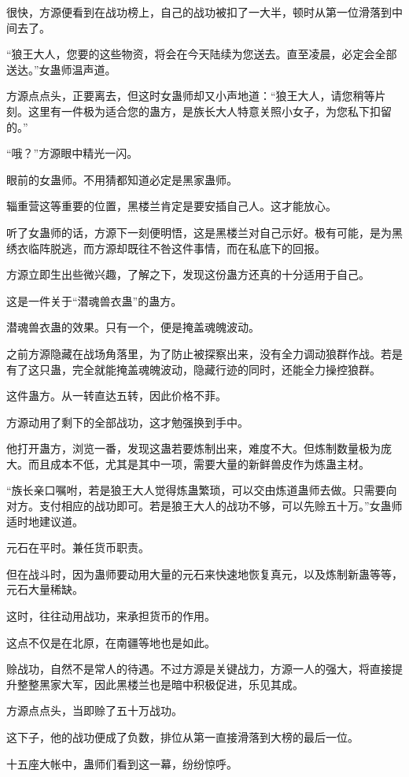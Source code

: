 \begin{this_body}
很快，方源便看到在战功榜上，自己的战功被扣了一大半，顿时从第一位滑落到中间去了。

“狼王大人，您要的这些物资，将会在今天陆续为您送去。直至凌晨，必定会全部送达。”女蛊师温声道。

方源点点头，正要离去，但这时女蛊师却又小声地道：“狼王大人，请您稍等片刻。这里有一件极为适合您的蛊方，是族长大人特意关照小女子，为您私下扣留的。”

“哦？”方源眼中精光一闪。

眼前的女蛊师。不用猜都知道必定是黑家蛊师。

辎重营这等重要的位置，黑楼兰肯定是要安插自己人。这才能放心。

听了女蛊师的话，方源下一刻便明悟，这是黑楼兰对自己示好。极有可能，是为黑绣衣临阵脱逃，而方源却既往不咎这件事情，而在私底下的回报。

方源立即生出些微兴趣，了解之下，发现这份蛊方还真的十分适用于自己。

这是一件关于“潜魂兽衣蛊”的蛊方。

潜魂兽衣蛊的效果。只有一个，便是掩盖魂魄波动。

之前方源隐藏在战场角落里，为了防止被探察出来，没有全力调动狼群作战。若是有了这只蛊，完全就能掩盖魂魄波动，隐藏行迹的同时，还能全力操控狼群。

这件蛊方。从一转直达五转，因此价格不菲。

方源动用了剩下的全部战功，这才勉强换到手中。

他打开蛊方，浏览一番，发现这蛊若要炼制出来，难度不大。但炼制数量极为庞大。而且成本不低，尤其是其中一项，需要大量的新鲜兽皮作为炼蛊主材。

“族长亲口嘱咐，若是狼王大人觉得炼蛊繁琐，可以交由炼道蛊师去做。只需要向对方。支付相应的战功即可。若是狼王大人的战功不够，可以先赊五十万。”女蛊师适时地建议道。

元石在平时。兼任货币职责。

但在战斗时，因为蛊师要动用大量的元石来快速地恢复真元，以及炼制新蛊等等，元石大量稀缺。

这时，往往动用战功，来承担货币的作用。

这点不仅是在北原，在南疆等地也是如此。

赊战功，自然不是常人的待遇。不过方源是关键战力，方源一人的强大，将直接提升整整黑家大军，因此黑楼兰也是暗中积极促进，乐见其成。

方源点点头，当即赊了五十万战功。

这下子，他的战功便成了负数，排位从第一直接滑落到大榜的最后一位。

十五座大帐中，蛊师们看到这一幕，纷纷惊呼。


\end{this_body}
